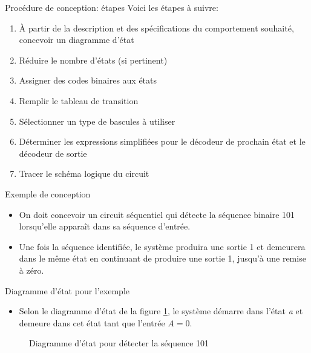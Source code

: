 \documentclass[presentation]{beamer}
\begin{document}
\begin{frame}[label={sec:orgbfe6940}]{Procédure de conception: étapes}
Voici les étapes à suivre:

\begin{enumerate}
\item À partir de la description et des spécifications du comportement
souhaité, concevoir un diagramme d'état
\item Réduire le nombre d'états (si pertinent)
\item Assigner des codes binaires aux états
\item Remplir le tableau de transition
\item Sélectionner un type de bascules à utiliser
\item Déterminer les expressions simplifiées pour le décodeur de prochain
état et le décodeur de sortie
\item Tracer le schéma logique du circuit
\end{enumerate}
\end{frame}

\begin{frame}[label={sec:org1b15d9e}]{Exemple de conception}
\begin{itemize}
\item On doit concevoir un circuit séquentiel qui détecte la séquence binaire 101 lorsqu'elle apparaît dans sa séquence d'entrée.

\item Une fois la séquence identifiée, le système produira une sortie 1 et demeurera dans le même état en continuant de produire une sortie 1, jusqu'à une remise à zéro.
\end{itemize}
\end{frame}

\begin{frame}[label={sec:org92fd04d}]{Diagramme d'état pour l'exemple}
\begin{itemize}
\item Selon le diagramme d'état de la figure \ref{fig:org051a916}, le système démarre dans l'état \emph{a} et demeure dans cet état tant que l'entrée \(A=0\).
\end{itemize}

\begin{figure}[htbp]
\centering

\caption{\label{fig:org051a916}Diagramme d'état pour détecter la séquence 101}
\end{figure}
\end{frame}
\end{document}
